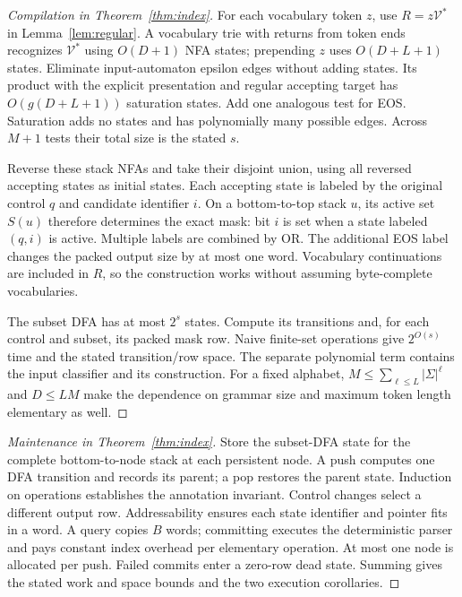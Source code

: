 \documentclass[manuscript,screen,11pt,nonacm]{acmart}
\theoremstyle{definition}\newtheorem{definition}{Definition}
\newcommand{\vocab}{\mathcal V}
\begin{document}
\begin{proof}[Compilation in Theorem~\ref{thm:index}]
For each vocabulary token $z$, use $R=z\vocab^*$ in Lemma~\ref{lem:regular}. A vocabulary trie with returns from token ends recognizes $\vocab^*$ using $O(D+1)$ NFA states; prepending $z$ uses $O(D+L+1)$ states. Eliminate input-automaton epsilon edges without adding states. Its product with the explicit presentation and regular accepting target has $O(g(D+L+1))$ saturation states. Add one analogous test for EOS. Saturation adds no states and has polynomially many possible edges. Across $M+1$ tests their total size is the stated $s$.

Reverse these stack NFAs and take their disjoint union, using all reversed accepting states as initial states. Each accepting state is labeled by the original control $q$ and candidate identifier $i$. On a bottom-to-top stack $u$, its active set $S(u)$ therefore determines the exact mask: bit $i$ is set when a state labeled $(q,i)$ is active. Multiple labels are combined by OR. The additional EOS label changes the packed output size by at most one word. Vocabulary continuations are included in $R$, so the construction works without assuming byte-complete vocabularies.

The subset DFA has at most $2^s$ states. Compute its transitions and, for each control and subset, its packed mask row. Naive finite-set operations give $2^{O(s)}$ time and the stated transition/row space. The separate polynomial term contains the input classifier and its construction. For a fixed alphabet, $M\le\sum_{\ell\le L}|\Sigma|^\ell$ and $D\le LM$ make the dependence on grammar size and maximum token length elementary as well.
\end{proof}

\begin{proof}[Maintenance in Theorem~\ref{thm:index}]
Store the subset-DFA state for the complete bottom-to-node stack at each persistent node. A push computes one DFA transition and records its parent; a pop restores the parent state. Induction on operations establishes the annotation invariant. Control changes select a different output row. Addressability ensures each state identifier and pointer fits in a word. A query copies $B$ words; committing executes the deterministic parser and pays constant index overhead per elementary operation. At most one node is allocated per push. Failed commits enter a zero-row dead state. Summing gives the stated work and space bounds and the two execution corollaries.
\end{proof}
\end{document}
